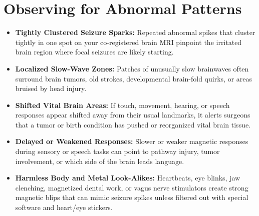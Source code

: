 \section{Observing for Abnormal Patterns}
\begin{itemize}
  \item \textbf{Tightly Clustered Seizure Sparks:} Repeated abnormal spikes that cluster tightly in one spot on your co-registered brain MRI pinpoint the irritated brain region where focal seizures are likely starting.
  \item \textbf{Localized Slow-Wave Zones:} Patches of unusually slow brainwaves often surround brain tumors, old strokes, developmental brain-fold quirks, or areas bruised by head injury.
  \item \textbf{Shifted Vital Brain Areas:} If touch, movement, hearing, or speech responses appear shifted away from their usual landmarks, it alerts surgeons that a tumor or birth condition has pushed or reorganized vital brain tissue.
  \item \textbf{Delayed or Weakened Responses:} Slower or weaker magnetic responses during sensory or speech tasks can point to pathway injury, tumor involvement, or which side of the brain leads language.
  \item \textbf{Harmless Body and Metal Look-Alikes:} Heartbeats, eye blinks, jaw clenching, magnetized dental work, or vagus nerve stimulators create strong magnetic blips that can mimic seizure spikes unless filtered out with special software and heart/eye stickers.
\end{itemize}

